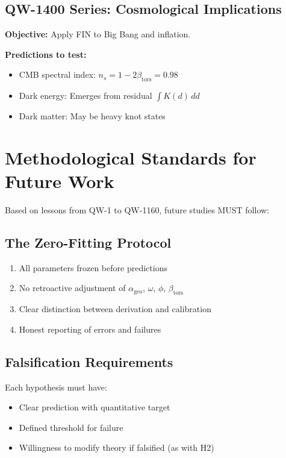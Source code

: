 \documentclass[11pt, a4paper]{article}
\theoremstyle{remark}
\newcommand{\alphageo}{\alpha_{\text{geo}}}
\newcommand{\betators}{\beta_{\text{tors}}}
\begin{document}
\subsection{QW-1400 Series: Cosmological Implications}

\textbf{Objective:} Apply FIN to Big Bang and inflation.

\textbf{Predictions to test:}
\begin{itemize}
    \item CMB spectral index: $n_s = 1 - 2\betators = 0.98$
    \item Dark energy: Emerges from residual $\int K(d) \, dd$
    \item Dark matter: May be heavy knot states
\end{itemize}

\section{Methodological Standards for Future Work}

Based on lessons from QW-1 to QW-1160, future studies MUST follow:

\subsection{The Zero-Fitting Protocol}

\begin{enumerate}
    \item All parameters frozen before predictions
    \item No retroactive adjustment of $\alphageo$, $\omega$, $\phi$, $\betators$
    \item Clear distinction between derivation and calibration
    \item Honest reporting of errors and failures
\end{enumerate}

\subsection{Falsification Requirements}

Each hypothesis must have:
\begin{itemize}
    \item Clear prediction with quantitative target
    \item Defined threshold for failure
    \item Willingness to modify theory if falsified (as with H2)
\end{itemize}
\end{document}
